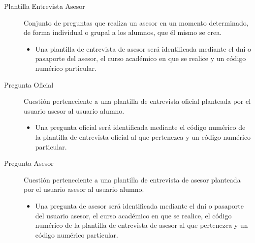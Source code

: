 \begin{description}
      \item[Plantilla Entrevista Asesor] Conjunto de preguntas que realiza un
      asesor en un momento determinado, de forma individual o grupal a los
      alumnos, que él mismo se crea.
      \begin{itemize}
       \item Una plantilla de entrevista de asesor será identificada mediante el
       dni o pasaporte del asesor, el curso académico en que se realice y
       un código numérico particular.
      \end{itemize}

      \item[Pregunta Oficial] Cuestión perteneciente a una plantilla de
      entrevista oficial planteada por el usuario asesor al usuario alumno.
      \begin{itemize}
       \item Una pregunta oficial será identificada mediante el código numérico
       de la plantilla de entrevista oficial al que pertenezca y un código
       numérico particular.
      \end{itemize}

      \item[Pregunta Asesor] Cuestión perteneciente a una plantilla de
      entrevista de asesor planteada por el usuario asesor al usuario alumno.
      \begin{itemize}
       \item Una pregunta de asesor será identificada mediante el dni o
       pasaporte del usuario asesor, el curso académico en que se realice, el
       código numérico de la plantilla de entrevista de asesor al que pertenezca
       y un código numérico particular.
      \end{itemize}
 \end{description}
